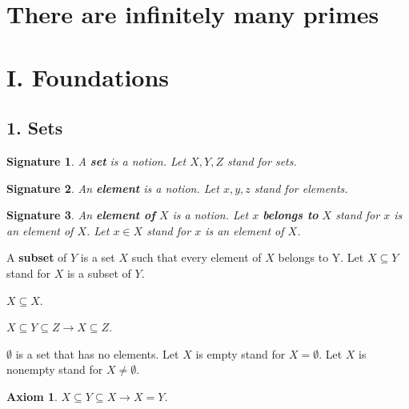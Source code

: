 \newtheorem{signature}{Signature}
\newtheorem{axiom}{Axiom}
\newcommand{\power}{{\cal P}}
\section{There are infinitely many primes}
\section{I. Foundations}


\subsection{1. Sets}


\begin{signature}
A {\bf set} is a notion.
Let $X,Y,Z$ stand for sets. 
\end{signature}

\begin{signature}
An {\bf element} is a notion.
Let $x,y,z$ stand for elements.
\end{signature}

\begin{signature}
An {\bf element of} $X$ is a notion.
Let $x$ {\bf belongs to} $X$ stand for $x$ is an element of $X$.
Let $x \in X$ stand for $x$ is an element of $X$.
\end{signature}

\begin{definition}
A {\bf subset} of $Y$ is a set $X$ such that
every element of $X$ belongs to Y.
Let $X \subseteq Y$ stand for $X$ is a subset of $Y$.
\end{definition}

\begin{lemma}$X \subseteq X$.\end{lemma}

\begin{lemma}
$X \subseteq Y \subseteq Z  \rightarrow  X \subseteq Z$.
\end{lemma}

\begin{definition}
$\emptyset$ is a set that has no elements.
Let $X$ is empty stand for $X = \emptyset$.
Let $X$ is nonempty stand for $X \neq \emptyset$.
\end{definition}

\begin{axiom}
$X \subseteq Y \subseteq X  \rightarrow  X = Y$.
\end{axiom}

